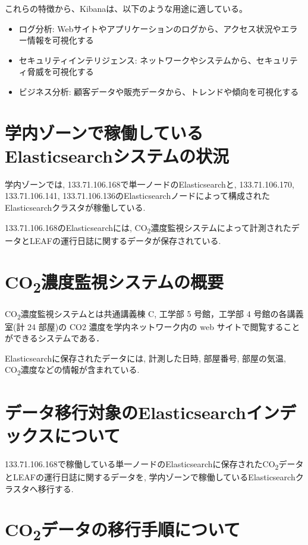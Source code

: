 これらの特徴から、Kibanaは、以下のような用途に適している。

\begin{itemize}
    \item ログ分析: Webサイトやアプリケーションのログから、アクセス状況やエラー情報を可視化する
    \item セキュリティインテリジェンス: ネットワークやシステムから、セキュリティ脅威を可視化する
    \item ビジネス分析: 顧客データや販売データから、トレンドや傾向を可視化する
\end{itemize}

\section{学内ゾーンで稼働しているElasticsearchシステムの状況}
学内ゾーンでは, 133.71.106.168で単一ノードのElasticsearchと, 133.71.106.170, 133.71.106.141, 133.71.106.136のElasticsearchノードによって構成されたElasticsearchクラスタが稼働している.

133.71.106.168のElasticsearchには, CO\textsubscript{2}濃度監視システムによって計測されたデータとLEAFの運行日誌に関するデータが保存されている.

\section{CO\textsubscript{2}濃度監視システムの概要}
CO\textsubscript{2}濃度監視システムとは共通講義棟 C, 工学部 5 号館，工学部 4 号館の各講義室(計 24 部屋)の CO2 濃度を学内ネットワーク内の web サイトで閲覧することができるシステムである．

Elasticsearchに保存されたデータには, 計測した日時, 部屋番号, 部屋の気温, CO\textsubscript{2}濃度などの情報が含まれている.

\section{データ移行対象のElasticsearchインデックスについて}

133.71.106.168で稼働している単一ノードのElasticsearchに保存されたCO\textsubscript{2}データとLEAFの運行日誌に関するデータを, 学内ゾーンで稼働しているElasticsearchクラスタへ移行する.

\section{CO\textsubscript{2}データの移行手順について}

